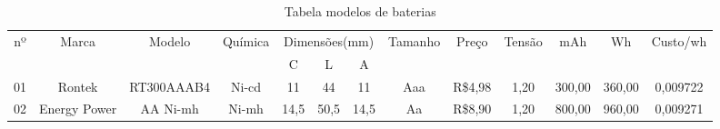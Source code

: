 
\label{sc:tabela_modelos_bateria}

\begin{table}[htp]
\caption{Tabela modelos de baterias}
\vspace{0.5cm}
\label{tabela:tabela_modelos_bateria_label}
\begin{tabular}{|c|c|c|c|c|c|c|c|c|c|c|c|c|}
\hline
\multicolumn{1}{|c|}{\multirow{2}{*}{nº}} & \multicolumn{1}{c|}{\multirow{2}{*}{Marca}} & \multicolumn{1}{c|}{\multirow{2}{*}{Modelo}} & \multicolumn{1}{c|}{\multirow{2}{*}{Química}} & \multicolumn{3}{c|}{Dimensões(mm)} & \multicolumn{1}{c|}{\multirow{2}{*}{Tamanho}} & \multicolumn{1}{c|}{\multirow{2}{*}{Preço}} & \multicolumn{1}{c|}{\multirow{2}{*}{Tensão}} & \multicolumn{1}{c|}{\multirow{2}{*}{mAh}} & \multicolumn{1}{c|}{\multirow{2}{*}{Wh}} & \multicolumn{1}{c|}{\multirow{2}{*}{Custo/wh}} \\ \cline{5-7}
\multicolumn{1}{|c|}{}                           & \multicolumn{1}{c|}{}                       & \multicolumn{1}{c|}{}                        & \multicolumn{1}{c|}{}                                & C          & L         & A         & \multicolumn{1}{c|}{}                                   & \multicolumn{1}{c|}{}                       & \multicolumn{1}{c|}{}                                    & \multicolumn{1}{c|}{}                     & \multicolumn{1}{c|}{}                    & \multicolumn{1}{c|}{}                          \\[2pt] \hline
01                                               & Rontek                                      & RT300AAAB4                                   & Ni-cd                                                & 11         & 44        & 11        & Aaa                                                     & R\$4,98                                     & 1,20                                                     & 300,00                                    & 360,00                                   & 0,009722                                       \\[2pt] \hline 
02                                               & Energy Power                                & AA Ni-mh                                     & Ni-mh                                                & 14,5       & 50,5      & 14,5      & Aa                                                      & R\$8,90                                     & 1,20                                                     & 800,00                                    & 960,00                                   & 0,009271                                       \\[2pt] \hline

\end{tabular}
\end{table}
